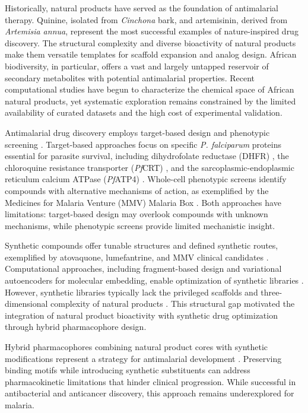 \documentclass[journal=jcisd8,manuscript=article]{achemso}
\begin{document}
Historically, natural products have served as the foundation of antimalarial therapy. Quinine, isolated from \textit{Cinchona} bark, and artemisinin, derived from \textit{Artemisia annua}, represent the most successful examples of nature-inspired drug discovery. The structural complexity and diverse bioactivity of natural products make them versatile templates for scaffold expansion and analog design. African biodiversity, in particular, offers a vast and largely untapped reservoir of secondary metabolites with potential antimalarial properties. Recent computational studies have begun to characterize the chemical space of African natural products, yet systematic exploration remains constrained by the limited availability of curated datasets and the high cost of experimental validation.

Antimalarial drug discovery employs target-based design and phenotypic screening \cite{Wells2015}. Target-based approaches focus on specific \textit{P. falciparum} proteins essential for parasite survival, including dihydrofolate reductase (DHFR) \cite{Costanzo2011}, the chloroquine resistance transporter (\emph{Pf}CRT) \cite{Fidock2000}, and the sarcoplasmic-endoplasmic reticulum calcium ATPase (\emph{Pf}ATP4) \cite{SiqueiraNeto2023}. Whole-cell phenotypic screens identify compounds with alternative mechanisms of action, as exemplified by the Medicines for Malaria Venture (MMV) Malaria Box \cite{Spangenberg2013}. Both approaches have limitations: target-based design may overlook compounds with unknown mechanisms, while phenotypic screens provide limited mechanistic insight.

Synthetic compounds offer tunable structures and defined synthetic routes, exemplified by atovaquone, lumefantrine, and MMV clinical candidates \cite{Kumar2024}. Computational approaches, including fragment-based design and variational autoencoders for molecular embedding, enable optimization of synthetic libraries \cite{Pandey2023, Gorgulla2020, Buskes2023}. However, synthetic libraries typically lack the privileged scaffolds and three-dimensional complexity of natural products \cite{Ancajas2024}. This structural gap motivated the integration of natural product bioactivity with synthetic drug optimization through hybrid pharmacophore design.

Hybrid pharmacophores combining natural product cores with synthetic modifications represent a strategy for antimalarial development \cite{Souza2019}. Preserving binding motifs while introducing synthetic substituents can address pharmacokinetic limitations that hinder clinical progression. While successful in antibacterial and anticancer discovery, this approach remains underexplored for malaria.
\end{document}

